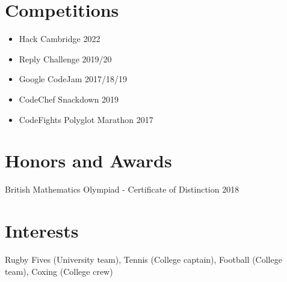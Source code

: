 \documentclass[a4paper,20pt]{article}
\newcommand{\resumeSubHeadingListStart}{\begin{itemize}[leftmargin=*]}
\newcommand{\resumeSubHeadingListEnd}{\end{itemize}}
\begin{document}
\section{Competitions}
\resumeSubHeadingListStart
    \item Hack Cambridge 2022
    \item Reply Challenge 2019/20
    \item Google CodeJam 2017/18/19
    \item CodeChef Snackdown 2019
    \item CodeFights Polyglot Marathon 2017
\resumeSubHeadingListEnd
\section{Honors and Awards}
\begin{description}[font=$\bullet$]
    \item British Mathematics Olympiad - Certificate of Distinction 2018
\end{description}
\section{Interests}
Rugby Fives (University team), Tennis (College captain), Football (College team), Coxing (College crew)
\end{document}
